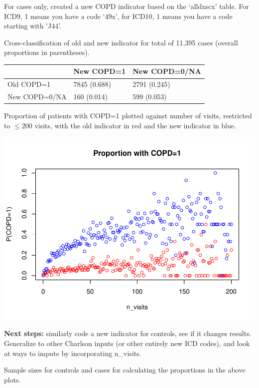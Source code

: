 \documentclass[12pt]{article}
\begin{document}
For cases only, created a new COPD indicator based on the `alldxscx' table. For ICD9, 1 means you have a code `49x', for ICD10, 1 means you have a code starting with 'J44'.

Cross-classification of old and new indicator for total of 11,395 cases (overall proportions in parentheses).

\begin{center}
\begin{tabular}{|l|l|l|}
\hline
 & New COPD=1 & New COPD=0/NA \\ \hline
 Old COPD=1 & 7845 (0.688) & 2791 (0.245) \\ \hline
 New COPD=0/NA & 160 (0.014) & 599 (0.053) \\ \hline
\end{tabular}
\end{center}

Proportion of patients with COPD=1 plotted against number of visits, restricted to $\leq 200$ visits, with the old indicator in red and the new indicator in blue.

\begin{center}
\includegraphics[width=.6\textwidth]{nvisits_scatternewCOPD200.pdf}
\end{center}

{\bf Next steps:} similarly code a new indicator for controls, see if it changes results. Generalize to other Charlson inputs (or other entirely new ICD codes), and look at ways to impute by incorporating n\_visits.

\pagebreak

Sample sizes for controls and cases for calculating the proportions in the above plots.
\end{document}

